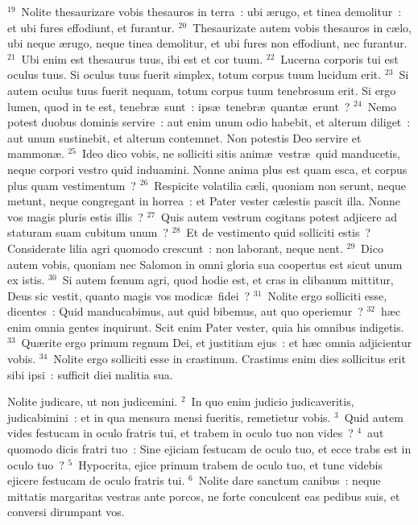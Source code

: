 ${}^{19}$~Nolite thesaurizare vobis thesauros in terra~: ubi \ae rugo, et tinea demolitur~: et ubi fures effodiunt, et furantur.
${}^{20}$~Thesaurizate autem vobis thesauros in c\ae lo, ubi neque \ae rugo, neque tinea demolitur, et ubi fures non effodiunt, nec furantur.
${}^{21}$~Ubi enim est thesaurus tuus, ibi est et cor tuum.
${}^{22}$~Lucerna corporis tui est oculus tuus. Si oculus tuus fuerit simplex, totum corpus tuum lucidum erit.
${}^{23}$~Si autem oculus tuus fuerit nequam, totum corpus tuum tenebrosum erit. Si ergo lumen, quod in te est, tenebr\ae\ sunt~: ips\ae\ tenebr\ae\ quant\ae\ erunt~?
${}^{24}$~Nemo potest duobus dominis servire~: aut enim unum odio habebit, et alterum diliget~: aut unum sustinebit, et alterum contemnet. Non potestis Deo servire et mammon\ae .
${}^{25}$~Ideo dico vobis, ne solliciti sitis anim\ae\ vestr\ae\ quid manducetis, neque corpori vestro quid induamini. Nonne anima plus est quam esca, et corpus plus quam vestimentum~?
${}^{26}$~Respicite volatilia c\ae li, quoniam non serunt, neque metunt, neque congregant in horrea~: et Pater vester c\ae lestis pascit illa. Nonne vos magis pluris estis illis~?
${}^{27}$~Quis autem vestrum cogitans potest adjicere ad staturam suam cubitum unum~?
${}^{28}$~Et de vestimento quid solliciti estis~? Considerate lilia agri quomodo crescunt~: non laborant, neque nent.
${}^{29}$~Dico autem vobis, quoniam nec Salomon in omni gloria sua coopertus est sicut unum ex istis.
${}^{30}$~Si autem fœnum agri, quod hodie est, et cras in clibanum mittitur, Deus sic vestit, quanto magis vos modic\ae\ fidei~?
${}^{31}$~Nolite ergo solliciti esse, dicentes~: Quid manducabimus, aut quid bibemus, aut quo operiemur~?
${}^{32}$~h\ae c enim omnia gentes inquirunt. Scit enim Pater vester, quia his omnibus indigetis.
${}^{33}$~Qu\ae rite ergo primum regnum Dei, et justitiam ejus~: et h\ae c omnia adjicientur vobis.
${}^{34}$~Nolite ergo solliciti esse in crastinum. Crastinus enim dies sollicitus erit sibi ipsi~: sufficit diei malitia sua.

\lettrine[lines=10,image=true,loversize=0.05,lraise=-0.03]{N}{}olite judicare, ut non judicemini.
${}^{2}$~In quo enim judicio judicaveritis, judicabimini~: et in qua mensura mensi fueritis, remetietur vobis.
${}^{3}$~Quid autem vides festucam in oculo fratris tui, et trabem in oculo tuo non vides~?
${}^{4}$~aut quomodo dicis fratri tuo~: Sine ejiciam festucam de oculo tuo, et ecce trabs est in oculo tuo~?
${}^{5}$~Hypocrita, ejice primum trabem de oculo tuo, et tunc videbis ejicere festucam de oculo fratris tui.
${}^{6}$~Nolite dare sanctum canibus~: neque mittatis margaritas vestras ante porcos, ne forte conculcent eas pedibus suis, et conversi dirumpant vos.


